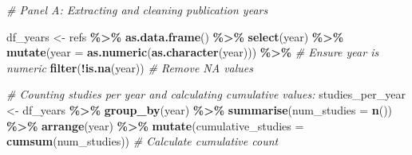 \documentclass[
]{article}
\newenvironment{Shaded}{\begin{snugshade}}{\end{snugshade}}
\newcommand{\AttributeTok}[1]{\textcolor[rgb]{0.13,0.29,0.53}{#1}}
\newcommand{\CommentTok}[1]{\textcolor[rgb]{0.56,0.35,0.01}{\textit{#1}}}
\newcommand{\FunctionTok}[1]{\textcolor[rgb]{0.13,0.29,0.53}{\textbf{#1}}}
\newcommand{\NormalTok}[1]{#1}
\newcommand{\OtherTok}[1]{\textcolor[rgb]{0.56,0.35,0.01}{#1}}
\newcommand{\SpecialCharTok}[1]{\textcolor[rgb]{0.81,0.36,0.00}{\textbf{#1}}}
\begin{document}
\begin{Shaded}
\begin{Highlighting}[]
\CommentTok{\# Panel A: Extracting and cleaning publication years}

\NormalTok{df\_years }\OtherTok{\textless{}{-}}\NormalTok{ refs }\SpecialCharTok{\%\textgreater{}\%}
  \FunctionTok{as.data.frame}\NormalTok{() }\SpecialCharTok{\%\textgreater{}\%}
  \FunctionTok{select}\NormalTok{(year) }\SpecialCharTok{\%\textgreater{}\%}
  \FunctionTok{mutate}\NormalTok{(}\AttributeTok{year =} \FunctionTok{as.numeric}\NormalTok{(}\FunctionTok{as.character}\NormalTok{(year))) }\SpecialCharTok{\%\textgreater{}\%}  \CommentTok{\# Ensure year is numeric}
  \FunctionTok{filter}\NormalTok{(}\SpecialCharTok{!}\FunctionTok{is.na}\NormalTok{(year))  }\CommentTok{\# Remove NA values}

\CommentTok{\# Counting studies per year and calculating cumulative values:}
\NormalTok{studies\_per\_year }\OtherTok{\textless{}{-}}\NormalTok{ df\_years }\SpecialCharTok{\%\textgreater{}\%}
  \FunctionTok{group\_by}\NormalTok{(year) }\SpecialCharTok{\%\textgreater{}\%}
  \FunctionTok{summarise}\NormalTok{(}\AttributeTok{num\_studies =} \FunctionTok{n}\NormalTok{()) }\SpecialCharTok{\%\textgreater{}\%}
  \FunctionTok{arrange}\NormalTok{(year) }\SpecialCharTok{\%\textgreater{}\%}
  \FunctionTok{mutate}\NormalTok{(}\AttributeTok{cumulative\_studies =} \FunctionTok{cumsum}\NormalTok{(num\_studies))  }\CommentTok{\# Calculate cumulative count}


\end{Highlighting}
\end{Shaded}
\end{document}
